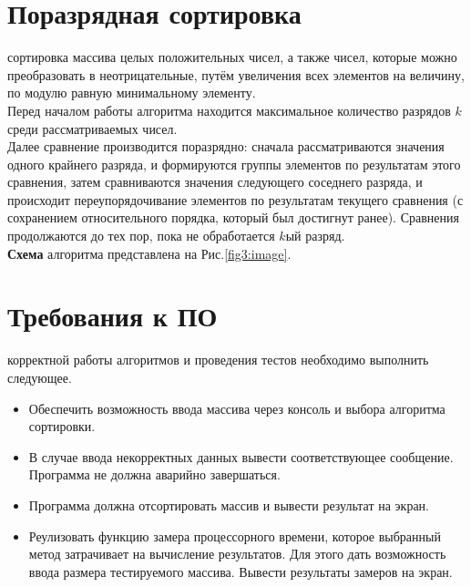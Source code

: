 \section{Поразрядная сортировка}
 сортировка массива целых положительных чисел, а также чисел, которые можно преобразовать в неотрицательные, путём увеличения всех элементов на величину, по модулю равную минимальному элементу.\\

Перед началом работы алгоритма находится максимальное количество разрядов $k$ среди рассматриваемых чисел.\\

Далее сравнение производится поразрядно: сначала рассматриваются значения одного крайнего разряда, и формируются группы элементов по результатам этого сравнения, затем сравниваются значения следующего соседнего разряда, и происходит переупорядочивание элементов по результатам текущего сравнения (с сохранением относительного порядка, который был достигнут ранее). Сравнения продолжаются до тех пор, пока не обработается $k$ый разряд.\\

\textbf{Схема} алгоритма представлена на Рис.\ref{fig3:image}.

\section{Требования к ПО}
 корректной работы алгоритмов и проведения тестов необходимо выполнить следующее.
\begin{itemize}
	\item Обеспечить возможность ввода массива через консоль и выбора алгоритма сортировки.
	\item В случае ввода некорректных данных вывести соответствующее сообщение. Программа не должна аварийно завершаться.
	\item Программа должна отсортировать массив и вывести результат на экран.
	\item Реулизовать функцию замера процессорного времени, которое выбранный метод затрачивает на вычисление результатов. Для этого дать возможность ввода размера тестируемого массива. Вывести результаты замеров на экран.
\end{itemize}

